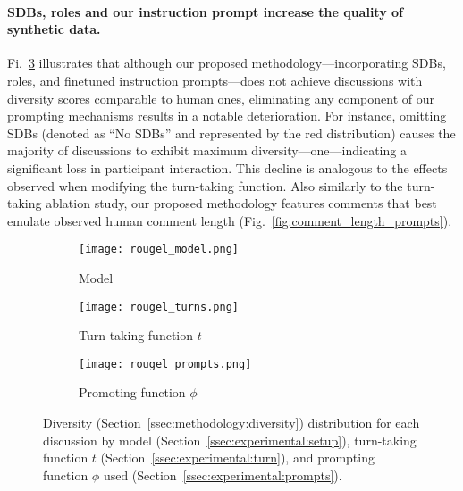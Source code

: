 \paragraph{\acp{SDB}, roles and our instruction prompt increase the quality of synthetic data.} Fi.~\ref{fig:rougel_prompts} illustrates that although our proposed methodology—incorporating \acp{SDB}, roles, and finetuned instruction prompts—does not achieve discussions with diversity scores comparable to human ones, eliminating any component of our prompting mechanisms results in a notable deterioration. For instance, omitting \acp{SDB} (denoted as ``No \acp{SDB}'' and represented by the red distribution) causes the majority of discussions to exhibit maximum diversity—one—indicating a significant loss in participant interaction. This decline is analogous to the effects observed when modifying the turn-taking function. Also similarly to the turn-taking ablation study, our proposed methodology features comments that best emulate observed human comment length (Fig.~\ref{fig:comment_length_prompts}).

\begin{figure*}[t]
    \begin{subfigure}{0.32\linewidth}
        \texttt{[image: rougel\_model.png]}
        \caption{Model}
        \label{fig:rougel_model}
    \end{subfigure}%
    \hfill
    \begin{subfigure}{0.32\linewidth}
        \texttt{[image: rougel\_turns.png]}
        \caption{Turn-taking function $t$}
        \label{fig:rougel_turns}
    \end{subfigure}%
    \hfill
    \begin{subfigure}{0.32\linewidth}
        \texttt{[image: rougel\_prompts.png]}
        \caption{Promoting function $\phi$}
        \label{fig:rougel_prompts}
    \end{subfigure}%

    \caption{Diversity (Section~\ref{ssec:methodology:diversity}) distribution for each discussion by model (Section~\ref{ssec:experimental:setup}), turn-taking function $t$ (Section~\ref{ssec:experimental:turn}), and prompting function $\phi$ used (Section~\ref{ssec:experimental:prompts}).}
    \label{fig:diversity}
\end{figure*}

